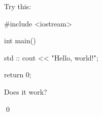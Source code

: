 Try this:

\begin{console}

#include <iostream>



int main()

{

    std    ::    cout << "Hello, world!\n";



    return 0;

}

\end{console}

Does it work?

\qed

